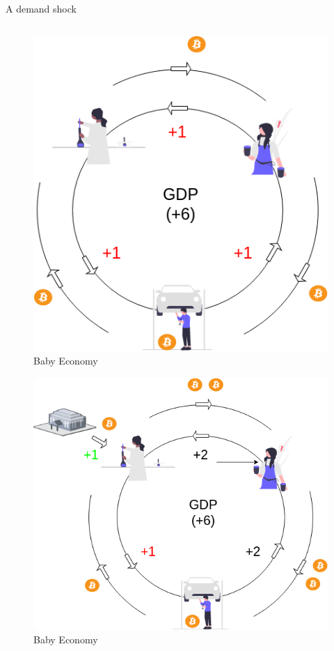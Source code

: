 \begin{frame}{A demand shock}
\protect\hypertarget{a-demand-shock-1}{}
\begin{columns}[T]
\begin{column}{0.48\textwidth}
\begin{overprint}


\begin{figure}
\centering
\includegraphics[width=1\textwidth,height=\textheight]{assets/circular_keynes_badeq.png}
\caption{Baby Economy}
\end{figure}


\begin{figure}
\centering
\includegraphics[width=1\textwidth,height=\textheight]{assets/circular_keynes_gvt.png}
\caption{Baby Economy}
\end{figure}


\end{overprint}
\end{column}
\end{columns}
\end{frame}
